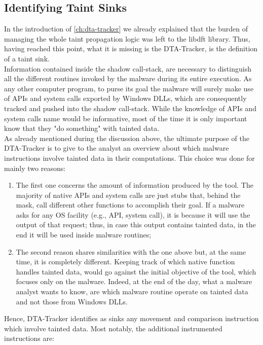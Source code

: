 \documentclass[LaM,binding=0.6cm]{sapthesis}
\begin{document}
\subsection{Identifying Taint Sinks}
\label{subsec:taintsinks}
In the introduction of \autoref{ch:dta-tracker} we already explained that the burden of managing the whole taint propagation logic was left to the libdft library. Thus, having reached this point, what it is missing is the DTA-Tracker, is the definition of a taint sink.\\

Information contained inside the shadow call-stack, are necessary to distinguish all the different routines invoked by the malware during its entire execution. As any other computer program, to purse its goal the malware will surely make use of APIs and system calls exported by Windows DLLs, which are consequently tracked and pushed into the shadow call-stack. While the knowledge of APIs and system calls name would be informative, most of the time it is only important know that they "do something" with tainted data.\\
As already mentioned during the discussion above, the ultimate purpose of the DTA-Tracker is to give to the analyst an overview about which malware instructions involve tainted data in their computations. This choice was done for mainly two reasons:
\begin{enumerate}
\item The first one concerns the amount of information produced by the tool. The majority of native APIs and system calls are just stubs that, behind the mask, call different other functions to accomplish their goal. If a malware asks for any OS facility (e.g., API, system call), it is because it will use the output of that request; thus, in case this output contains tainted data, in the end it will be used inside malware routines;
\item The second reason shares similarities with the one above but, at the same time, it is completely different. Keeping track of which native function handles tainted data, would go against the initial objective of the tool, which focuses only on the malware. Indeed, at the end of the day, what a malware analyst wants to know, are which malware routine operate on tainted data and not those from Windows DLLs.
\end{enumerate}
Hence, DTA-Tracker identifies as sinks any movement and comparison instruction which involve tainted data. Most notably, the additional instrumented instructions are:
\end{document}
